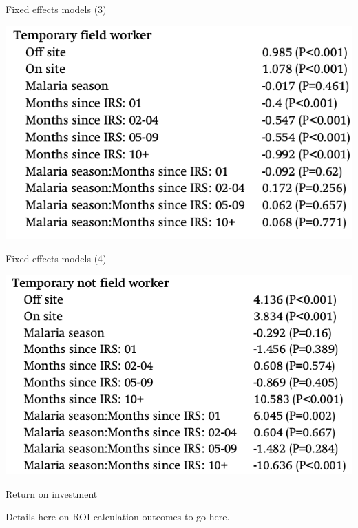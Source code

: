\documentclass[ignorenonframetext,]{beamer}
\begin{document}
\begin{frame}{Fixed effects models (3)}

\includegraphics{images/fe3.png}

\end{frame}

\begin{frame}{Fixed effects models (4)}

\includegraphics{images/fe4.png}

\end{frame}

\begin{frame}{Return on investment}

Details here on ROI calculation outcomes to go here.

\end{frame}
\end{document}
